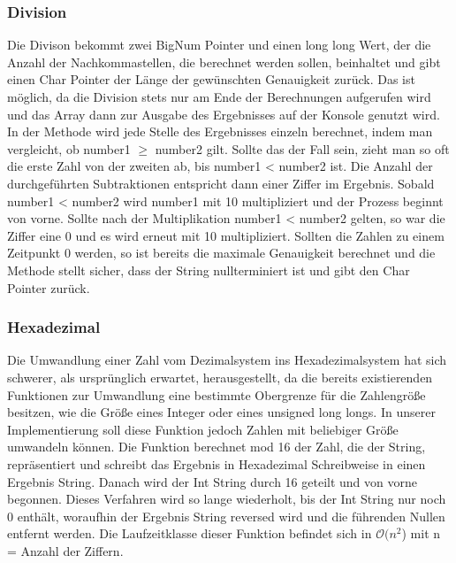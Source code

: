 \documentclass[course=erap]{aspdoc}
\begin{document}
    \subsubsection{Division}
    Die Divison bekommt zwei BigNum Pointer und einen long long Wert, der die Anzahl der Nachkommastellen, die berechnet werden sollen, beinhaltet und gibt einen Char Pointer der Länge der gewünschten Genauigkeit zurück. Das ist möglich, da die Division stets nur am Ende der Berechnungen aufgerufen wird und das Array dann zur Ausgabe des Ergebnisses auf der Konsole genutzt wird. In der Methode wird jede Stelle des Ergebnisses einzeln berechnet, indem man vergleicht, ob number1 $\geq$ number2 gilt. Sollte das der Fall sein, zieht man so oft die erste Zahl von der zweiten ab, bis number1 < number2 ist. Die Anzahl der durchgeführten Subtraktionen entspricht dann einer Ziffer im Ergebnis. Sobald number1 < number2 wird number1 mit 10 multipliziert und der Prozess beginnt von vorne. Sollte nach der Multiplikation number1 < number2 gelten, so war die Ziffer eine 0 und es wird erneut mit 10 multipliziert. Sollten die Zahlen zu einem Zeitpunkt 0 werden, so ist bereits die maximale Genauigkeit berechnet und die Methode stellt sicher, dass der String nullterminiert ist und gibt den Char Pointer zurück.
    \subsubsection{Hexadezimal}
    Die Umwandlung einer Zahl vom Dezimalsystem ins Hexadezimalsystem hat sich schwerer, als ursprünglich erwartet, herausgestellt, da die bereits existierenden Funktionen zur Umwandlung eine bestimmte Obergrenze für die Zahlengröße besitzen, wie die Größe eines Integer oder eines unsigned long longs. In unserer Implementierung soll diese Funktion jedoch Zahlen mit beliebiger Größe umwandeln können.
    Die Funktion berechnet mod 16 der Zahl, die der String, repräsentiert und schreibt das Ergebnis in Hexadezimal Schreibweise in einen Ergebnis String. Danach wird der Int String durch 16 geteilt und von vorne begonnen.
    Dieses Verfahren wird so lange wiederholt, bis der Int String nur noch 0 enthält, woraufhin der Ergebnis String reversed wird und die führenden Nullen entfernt werden.
    Die Laufzeitklasse dieser Funktion befindet sich in \begin{math}\mathcal{O}(
    n^2
    \end{math})
    mit n = Anzahl der Ziffern.
\end{document}
